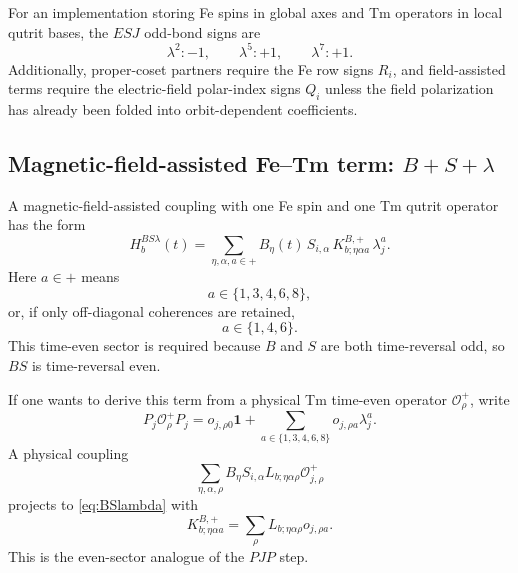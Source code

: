 \documentclass[11pt,a4paper]{article}
\begin{document}
\begin{implbox}
For an implementation storing Fe spins in global axes and Tm operators in local qutrit bases, the $E S J$ odd-bond signs are
\begin{equation}
  \lambda^2:-1,\qquad \lambda^5:+1,\qquad \lambda^7:+1.
\end{equation}
Additionally, proper-coset partners require the Fe row signs $R_i$, and field-assisted terms require the electric-field polar-index signs $Q_i$ unless the field polarization has already been folded into orbit-dependent coefficients.
\end{implbox}

\subsection{Magnetic-field-assisted Fe--Tm term: $B+S+\lambda$}

A magnetic-field-assisted coupling with one Fe spin and one Tm qutrit operator has the form
\begin{equation}
  \boxed{
  H^{BS\lambda}_{b}(t)
  =\sum_{\eta,\alpha,a\in +}
  B_\eta(t)\,S_{i,\alpha}\,
  K^{B,+}_{b;\eta\alpha a}\,\lambda_j^a.}
  \label{eq:BSlambda}
\end{equation}
Here $a\in+$ means
\begin{equation}
  a\in\{1,3,4,6,8\},
\end{equation}
or, if only off-diagonal coherences are retained,
\begin{equation}
  a\in\{1,4,6\}.
\end{equation}
This time-even sector is required because $B$ and $S$ are both time-reversal odd, so $B S$ is time-reversal even.

If one wants to derive this term from a physical Tm time-even operator $\mathcal O_\rho^+$, write
\begin{equation}
  P_j\mathcal O_\rho^+P_j
  =o_{j,\rho0}\mathbf1+
  \sum_{a\in\{1,3,4,6,8\}}o_{j,\rho a}\lambda_j^a.
\end{equation}
A physical coupling
\begin{equation}
  \sum_{\eta,\alpha,\rho}B_\eta S_{i,\alpha}L_{b;\eta\alpha\rho}\mathcal O_{j,\rho}^+
\end{equation}
projects to \cref{eq:BSlambda} with
\begin{equation}
  \boxed{
  K^{B,+}_{b;\eta\alpha a}=
  \sum_\rho L_{b;\eta\alpha\rho}o_{j,\rho a}.}
\end{equation}
This is the even-sector analogue of the $PJP$ step.
\end{document}
